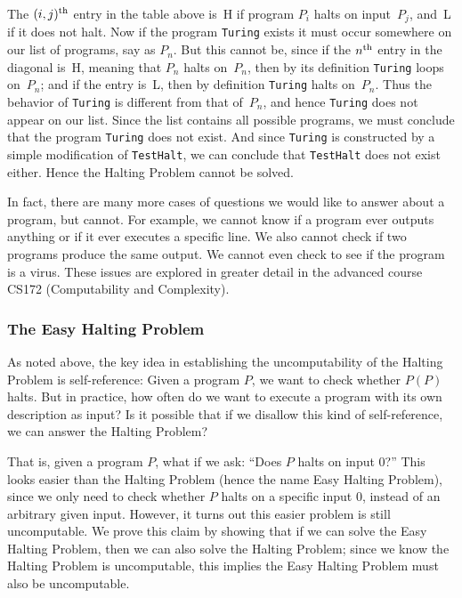 \documentclass[11pt,fleqn]{article}
\begin{document}
The $(i,j)^{\rm th}$ entry in the table above is~H if program $P_i$ halts on input~$P_j$, and~L if it does not halt.
Now if the program \texttt{Turing} exists it must occur somewhere on our list of programs, say as $P_n$.
But this cannot be, since if the $n^{\rm th}$ entry in the diagonal is~H, meaning that $P_n$
halts on~$P_n$, then by its definition \texttt{Turing} loops on~$P_n$; and if 
the entry is~L, then by definition \texttt{Turing} halts on~$P_n$.  Thus the behavior of \texttt{Turing} 
is different from that of~$P_n$, and hence \texttt{Turing} does not appear on our list.
Since the list contains all possible programs, we must conclude that the program
\texttt{Turing} does not exist.  And since \texttt{Turing} is constructed by a simple modification of
\texttt{TestHalt}, we can conclude that \texttt{TestHalt} does not exist either.  Hence the Halting
Problem cannot be solved.

In fact, there are many more cases of questions we would like to answer about a program, 
but cannot. For example, we cannot
know if a program ever outputs anything or if it ever executes a specific line. We also cannot check if two programs produce the same output. We cannot even
check to see if the program is a virus.  These issues are explored in greater detail in
the advanced course CS172 (Computability and Complexity).


\subsubsection*{The Easy Halting Problem}

As noted above, the key idea in establishing the uncomputability of the Halting Problem is self-reference: Given a program $P$, we want to check whether $P(P)$ halts. But in practice, how often do we want to execute a program with its own description as input? Is it possible that if we disallow this kind of self-reference, we can answer the Halting Problem?

That is, given a program $P$, what if we ask: ``Does $P$ halts on input $0$?'' This looks easier than the Halting Problem (hence the name Easy Halting Problem), since we only need to check whether $P$ halts on a specific input $0$, instead of an arbitrary given input. However, it turns out this easier problem is still uncomputable. We prove this claim by showing that if we can solve the Easy Halting Problem, then we can also solve the Halting Problem; since we know the Halting Problem is uncomputable, this implies the Easy Halting Problem must also be uncomputable.
\end{document}
